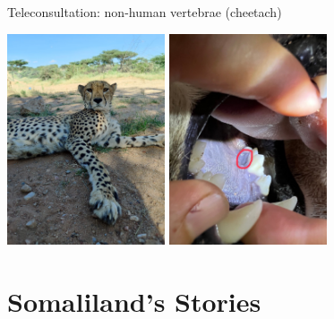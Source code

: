 \documentclass[aspectratio=169]{beamer}
\begin{document}
\begin{frame}{Teleconsultation: non-human vertebrae (cheetach)}
    \begin{center}
        \includegraphics[width=0.35\textwidth]{457256160987709682.jpg}        \includegraphics[width=0.35\textwidth, origin=c,angle=180]{IMG-5116.JPG}

    \end{center}
\end{frame}
\section{Somaliland's Stories}
\end{document}
